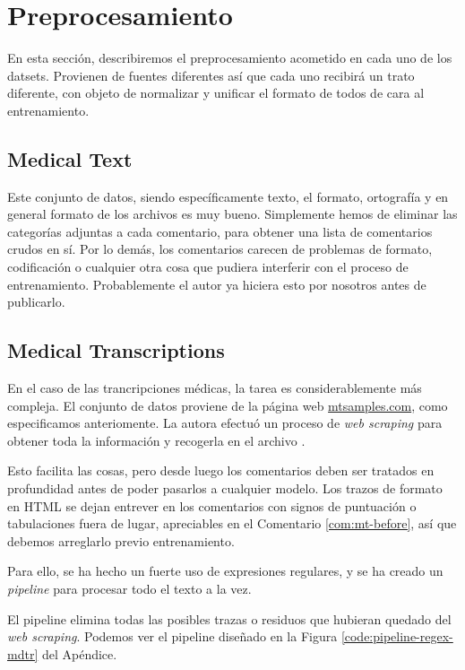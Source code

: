\section{Preprocesamiento}
\label{sec:preprocess}
En esta sección, describiremos el preprocesamiento acometido en cada uno de los datsets. Provienen de fuentes diferentes así que cada uno recibirá un trato diferente, con objeto de normalizar y unificar el formato de todos de cara al entrenamiento.




\subsection{Medical Text}
Este conjunto de datos, siendo específicamente texto, el formato, ortografía y en general formato de los archivos es muy bueno. Simplemente hemos de eliminar las categorías adjuntas a cada comentario, para obtener una lista de comentarios crudos en sí. Por lo demás, los comentarios carecen de problemas de formato, codificación o cualquier otra cosa que pudiera interferir con el proceso de entrenamiento. Probablemente el autor ya hiciera esto por nosotros antes de publicarlo.


\subsection{Medical Transcriptions}
En el caso de las trancripciones médicas, la tarea es considerablemente más compleja. El conjunto de datos proviene de la página web \url{mtsamples.com}, como especificamos anteriomente. La autora efectuó un proceso de \textit{web scraping} para obtener toda la información y recogerla en el archivo . 

Esto facilita las cosas, pero desde luego los comentarios deben ser tratados en profundidad antes de poder pasarlos a cualquier modelo. Los trazos de formato en HTML se dejan entrever en los comentarios con signos de puntuación o tabulaciones fuera de lugar, apreciables en el Comentario \ref{com:mt-before}, así que debemos arreglarlo previo entrenamiento.

Para ello, se ha hecho un fuerte uso de expresiones regulares, y se ha creado un \textit{pipeline} para procesar todo el texto a la vez.

El pipeline elimina todas las posibles trazas o residuos que hubieran quedado del \textit{web scraping}. Podemos ver el pipeline diseñado en la Figura \ref{code:pipeline-regex-mdtr} del Apéndice.

